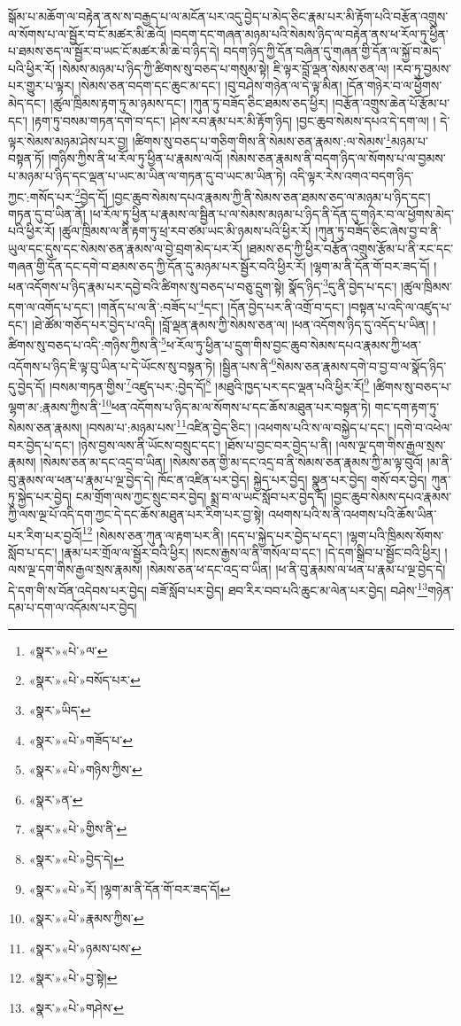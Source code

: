 སྒོམ་པ་མཆོག་ལ་བརྟེན་ནས་ས་བརྒྱད་པ་ལ་མངོན་པར་འདུ་བྱེད་པ་མེད་ཅིང་རྣམ་པར་མི་རྟོག་པའི་བརྩོན་འགྲུས་ལ་སོགས་པ་ལ་སྦྱོར་བ་ངོ་མཚར་མི་ཆེའོ། །བདག་དང་གཞན་མཉམ་པའི་སེམས་ཉིད་ལ་བརྟེན་ནས་ཕ་རོལ་ཏུ་ཕྱིན་པ་ཐམས་ཅད་ལ་སྦྱོར་བ་ཡང་ངོ་མཚར་མི་ཆེ་བ་ཉིད་དེ། བདག་ཉིད་ཀྱི་དོན་བཞིན་དུ་གཞན་གྱི་དོན་ལ་སྐྱོ་བ་མེད་པའི་ཕྱིར་རོ། །སེམས་མཉམ་པ་ཉིད་ཀྱི་ཚིགས་སུ་བཅད་པ་གསུམ་སྟེ། ཇི་ལྟར་བློ་ལྡན་སེམས་ཅན་ལ། །རབ་ཏུ་བྱམས་པར་གྱུར་པ་ལྟར། །སེམས་ཅན་བདག་དང་ཆུང་མ་དང་། །བུ་བཤེས་གཉེན་ལ་དེ་ལྟ་མིན། །དོན་གཉེར་བ་ལ་ཕྱོགས་མེད་དང་། །ཚུལ་ཁྲིམས་རྟག་ཏུ་མ་ཉམས་དང་། །ཀུན་ཏུ་བཟོད་ཅིང་ཐམས་ཅད་ཕྱིར། །བརྩོན་འགྲུས་ཆེན་པོ་རྩོམ་པ་དང་། །རྟག་ཏུ་བསམ་གཏན་དགེ་བ་དང་། །ཤེས་རབ་རྣམ་པར་མི་རྟོག་ཉིད། །བྱང་ཆུབ་སེམས་དཔའ་དེ་དག་ལ། །
དེ་ལྟར་སེམས་མཉམ་ཤེས་པར་བྱ། །ཚིགས་སུ་བཅད་པ་གཅིག་གིས་ནི་སེམས་ཅན་རྣམས་:ལ་སེམས་\footnote{«སྣར་»«པེ་»ལ་}མཉམ་པ་བསྟན་ཏོ། །གཉིས་ཀྱིས་ནི་ཕ་རོལ་ཏུ་ཕྱིན་པ་རྣམས་ལའོ། །སེམས་ཅན་རྣམས་ནི་བདག་ཉིད་ལ་སོགས་པ་ལ་བྱམས་པ་མཉམ་པ་ཉིད་དང་ལྡན་པ་ཡང་མ་ཡིན་ལ་གཏན་དུ་བ་ཡང་མ་ཡིན་ཏེ། འདི་ལྟར་རེས་འགའ་བདག་ཉིད་ཀྱང་:གསོད་པར་\footnote{«སྣར་»«པེ་»བསོད་པར་}བྱེད་དོ། །བྱང་ཆུབ་སེམས་དཔའ་རྣམས་ཀྱི་ནི་སེམས་ཅན་ཐམས་ཅད་ལ་མཉམ་པ་ཉིད་དང་། གཏན་དུ་བ་ཡིན་ནོ། །ཕ་རོལ་ཏུ་ཕྱིན་པ་རྣམས་ལ་སྦྱིན་པ་ལ་སེམས་མཉམ་པ་ཉིད་ནི་དོན་དུ་གཉེར་བ་ལ་ཕྱོགས་མེད་པའི་ཕྱིར་རོ། །ཚུལ་ཁྲིམས་ལ་ནི་རྟག་ཏུ་ཕྲ་རབ་ཙམ་ཡང་མི་ཉམས་པའི་ཕྱིར་རོ། །ཀུན་ཏུ་བཟོད་ཅིང་ཞེས་བྱ་བ་ནི་ཡུལ་དང་དུས་དང་སེམས་ཅན་རྣམས་ལ་བྱེ་བྲག་མེད་པར་རོ། །ཐམས་ཅད་ཀྱི་ཕྱིར་བརྩོན་འགྲུས་རྩོམ་པ་ནི་རང་དང་གཞན་གྱི་དོན་དང་དགེ་བ་ཐམས་ཅད་ཀྱི་དོན་དུ་མཉམ་པར་སྦྱོར་བའི་ཕྱིར་རོ། །ལྷག་མ་ནི་དོན་གོ་བར་ཟད་དོ། །ཕན་འདོགས་པ་ཉིད་རྣམ་པར་དབྱེ་བའི་ཚིགས་སུ་བཅད་པ་བཅུ་དྲུག་སྟེ། སྣོད་ཉིད་\footnote{«སྣར་»ཡིད་}དུ་ནི་བྱེད་པ་དང་། །ཚུལ་ཁྲིམས་དག་ལ་འགོད་པ་དང་། །གནོད་པ་ལ་ནི་:བཟོད་པ་\footnote{«སྣར་»«པེ་»གཟོད་པ་}དང་། །དོན་བྱེད་པར་ནི་འགྲོ་བ་དང་། །བསྟན་པ་འདི་ལ་འཛུད་པ་དང་། །ཐེ་ཚོམ་གཅོད་པར་བྱེད་པ་འདི། །བློ་ལྡན་རྣམས་ཀྱི་སེམས་ཅན་ལ། །ཕན་འདོགས་ཉིད་དུ་འདོད་པ་ཡིན། །ཚིགས་སུ་བཅད་པ་འདི་:གཉིས་ཀྱིས་ནི་\footnote{«སྣར་»«པེ་»གཉིས་ཀྱིས་}ཕ་རོལ་ཏུ་ཕྱིན་པ་དྲུག་གིས་བྱང་ཆུབ་སེམས་དཔའ་རྣམས་ཀྱི་ཕན་འདོགས་པ་ཉིད་ཇི་ལྟ་བུ་ཡིན་པ་དེ་ཡོངས་སུ་བསྟན་ཏེ། །སྦྱིན་པས་ནི་\footnote{«སྣར་»ན་}སེམས་ཅན་རྣམས་དགེ་བ་བྱ་བ་ལ་སྣོད་ཉིད་དུ་བྱེད་དོ། །བསམ་གཏན་གྱིས་\footnote{«སྣར་»«པེ་»གྱིས་ནི་}འཛུད་པར་:བྱེད་དོ།\footnote{«སྣར་»«པེ་»བྱེད་དེ།} །མཐུའི་ཁྱད་པར་དང་ལྡན་པའི་ཕྱིར་རོ།\footnote{«སྣར་»«པེ་»རོ། །ལྷག་མ་ནི་དོན་གོ་བར་ཟད་དོ།} །ཚིགས་སུ་བཅད་པ་ལྷག་མ་:རྣམས་ཀྱིས་ནི་\footnote{«སྣར་»«པེ་»རྣམས་ཀྱིས་}ཕན་འདོགས་པ་ཉིད་མ་ལ་སོགས་པ་དང་ཆོས་མཐུན་པར་བསྟན་ཏེ། གང་དག་རྟག་ཏུ་སེམས་ཅན་རྣམས། །བསམ་པ་:མཉམ་པས་\footnote{«སྣར་»«པེ་»ཉམས་པས་}འཛིན་བྱེད་ཅིང་། །འཕགས་པའི་ས་ལ་བསྐྱེད་པ་དང་། །དགེ་བ་འཕེལ་བར་བྱེད་པ་དང་། །ཉེས་བྱས་ལས་ནི་ཡོངས་བསྲུང་དང་། །ཐོས་པ་བྱང་བར་བྱེད་པ་ནི། །ལས་ལྔ་དག་གིས་རྒྱལ་སྲས་རྣམས། །སེམས་ཅན་མ་དང་འདྲ་བ་ཡིན། །སེམས་ཅན་གྱི་མ་དང་འདྲ་བ་ནི་སེམས་ཅན་རྣམས་ཀྱི་མ་ལྟ་བུའོ། །མ་ནི་བུ་རྣམས་ལ་ཕན་པ་རྣམ་པ་ལྔ་བྱེད་དེ། ཁོང་ན་འཛིན་པར་བྱེད། སྐྱེད་པར་བྱེད། སྣུན་པར་བྱེད། གསོ་བར་བྱེད། ཀུན་ཏུ་སྐྱེད་པར་བྱེད། ངམ་གྲོག་ལས་ཀྱང་སྲུང་བར་བྱེད། སྨྲ་བ་ལ་ཡང་སློབ་པར་བྱེད་དོ། །བྱང་ཆུབ་སེམས་དཔའ་རྣམས་ཀྱི་ལས་ལྔ་པོ་འདི་དག་ཀྱང་དེ་དང་ཆོས་མཐུན་པར་རིག་པར་བྱ་སྟེ། འཕགས་པའི་ས་ནི་འཕགས་པའི་ཆོས་ཡིན་པར་རིག་པར་བྱའོ།\footnote{«སྣར་»«པེ་»བྱ་སྟེ།} །སེམས་ཅན་ཀུན་ལ་རྟག་པར་ནི། །དད་པ་སྐྱེད་པར་བྱེད་པ་དང་། །ལྷག་པའི་ཁྲིམས་སོགས་སློབ་པ་དང་། །རྣམ་པར་གྲོལ་ལ་སྦྱོར་བའི་ཕྱིར། །སངས་རྒྱས་ལ་ནི་གསོལ་བ་དང་། །དེ་དག་སྒྲིབ་པ་སྦྱོང་བའི་ཕྱིར། །ལས་ལྔ་དག་གིས་རྒྱལ་སྲས་རྣམས། །སེམས་ཅན་ཕ་དང་འདྲ་བ་ཡིན། །ཕ་ནི་བུ་རྣམས་ལ་ཕན་པ་རྣམ་པ་ལྔ་བྱེད་དེ། དེ་དག་གི་ས་བོན་འདེབས་པར་བྱེད། བཟོ་སློབ་པར་བྱེད། ཐབ་རིར་བབ་པའི་ཆུང་མ་ལེན་པར་བྱེད། བཤེས་\footnote{«སྣར་»«པེ་»གཤེས་}གཉེན་དམ་པ་དག་ལ་འདོམས་པར་བྱེད། 